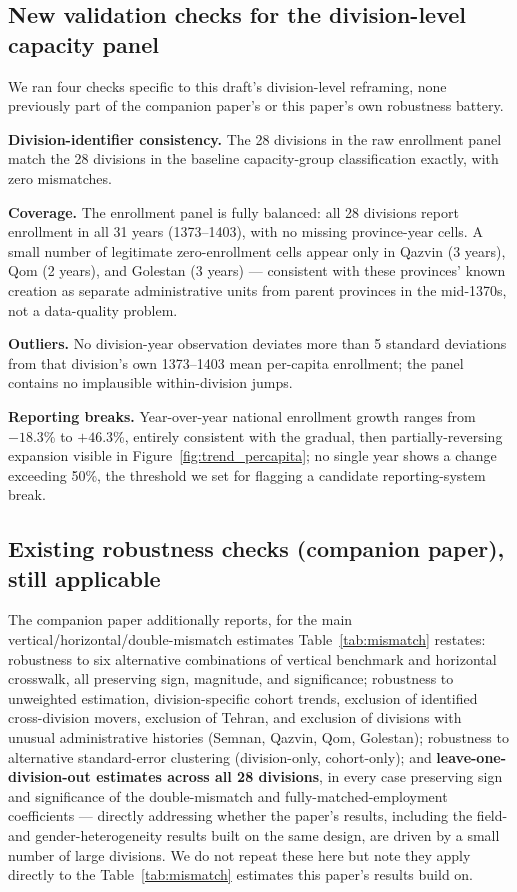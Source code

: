\documentclass[11pt]{article}
\begin{document}
\subsection{New validation checks for the division-level capacity panel}

We ran four checks specific to this draft's division-level reframing, none previously part of the companion paper's or this paper's own robustness battery.

\textbf{Division-identifier consistency.} The 28 divisions in the raw enrollment panel match the 28 divisions in the baseline capacity-group classification exactly, with zero mismatches.

\textbf{Coverage.} The enrollment panel is fully balanced: all 28 divisions report enrollment in all 31 years (1373--1403), with no missing province-year cells. A small number of legitimate zero-enrollment cells appear only in Qazvin (3 years), Qom (2 years), and Golestan (3 years) --- consistent with these provinces' known creation as separate administrative units from parent provinces in the mid-1370s, not a data-quality problem.

\textbf{Outliers.} No division-year observation deviates more than 5 standard deviations from that division's own 1373--1403 mean per-capita enrollment; the panel contains no implausible within-division jumps.

\textbf{Reporting breaks.} Year-over-year national enrollment growth ranges from $-18.3$\% to $+46.3$\%, entirely consistent with the gradual, then partially-reversing expansion visible in Figure~\ref{fig:trend_percapita}; no single year shows a change exceeding 50\%, the threshold we set for flagging a candidate reporting-system break.

\subsection{Existing robustness checks (companion paper), still applicable}

The companion paper additionally reports, for the main vertical/horizontal/double-mismatch estimates Table~\ref{tab:mismatch} restates: robustness to six alternative combinations of vertical benchmark and horizontal crosswalk, all preserving sign, magnitude, and significance; robustness to unweighted estimation, division-specific cohort trends, exclusion of identified cross-division movers, exclusion of Tehran, and exclusion of divisions with unusual administrative histories (Semnan, Qazvin, Qom, Golestan); robustness to alternative standard-error clustering (division-only, cohort-only); and \textbf{leave-one-division-out estimates across all 28 divisions}, in every case preserving sign and significance of the double-mismatch and fully-matched-employment coefficients --- directly addressing whether the paper's results, including the field- and gender-heterogeneity results built on the same design, are driven by a small number of large divisions. We do not repeat these here but note they apply directly to the Table~\ref{tab:mismatch} estimates this paper's results build on.
\end{document}
